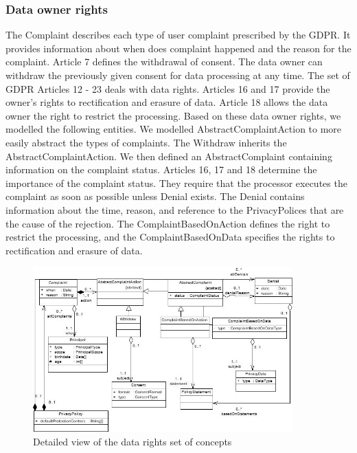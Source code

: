 \documentclass[11pt,english]{article}
\begin{document}
\subsubsection{Data owner rights}
The Complaint describes each type of user complaint prescribed by the GDPR. It provides information about when does complaint happened and the reason for the complaint. Article 7 defines the withdrawal of consent. The data owner can withdraw the previously given consent for data processing at any time. The set of GDPR Articles 12 - 23 deals with data rights. Articles 16 and 17 provide the owner's rights to rectification and erasure of data. Article 18 allows the data owner the right to restrict the processing. Based on these data owner rights, we modelled the following entities. \newline We modelled AbstractComplaintAction to more easily abstract the types of complaints. The Withdraw inherits the AbstractComplaintAction. We then defined an AbstractComplaint containing information on the complaint status. Articles 16, 17 and 18 determine the importance of the complaint status. They require that the processor executes the complaint as soon as possible unless Denial exists. The Denial contains information about the time, reason, and reference to the PrivacyPolices that are the cause of the rejection. The ComplaintBasedOnAction defines the right to restrict the processing, and the ComplaintBasedOnData specifies the rights to rectification and erasure of data.
\begin{figure}[H]
    \centering
    \includegraphics[width=10cm,scale=0.5]{images/dataRights.jpg}
    \caption{Detailed view of the data rights set of concepts}
    \label{fig:DataRights}
\end{figure}
\end{document}
